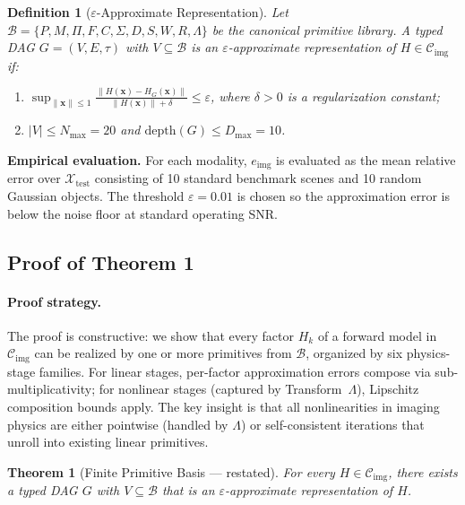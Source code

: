 \documentclass[11pt]{article}
\newtheorem{theorem}{Theorem}
\newtheorem{definition}{Definition}
\begin{document}
\begin{definition}[$\varepsilon$-Approximate Representation]
\label{def:eps_supp}
Let $\mathcal{B} = \{P, M, \Pi, F, C, \Sigma, D, S, W, R, \Lambda\}$ be the canonical primitive library. A typed DAG $G = (V, E, \tau)$ with $V \subseteq \mathcal{B}$ is an $\varepsilon$-approximate representation of $H \in \mathcal{C}_{\mathrm{img}}$ if:
\begin{enumerate}
  \item $\displaystyle \sup_{\|\mathbf{x}\| \leq 1} \frac{\|H(\mathbf{x}) - H_G(\mathbf{x})\|}{\|H(\mathbf{x})\| + \delta} \leq \varepsilon$, where $\delta > 0$ is a regularization constant;
  \item $|V| \leq N_{\max} = 20$ and $\mathrm{depth}(G) \leq D_{\max} = 10$.
\end{enumerate}
\end{definition}

\noindent\textbf{Empirical evaluation.} For each modality, $e_{\mathrm{img}}$ is evaluated as the mean relative error over $\mathcal{X}_{\mathrm{test}}$ consisting of 10 standard benchmark scenes and 10 random Gaussian objects. The threshold $\varepsilon = 0.01$ is chosen so the approximation error is below the noise floor at standard operating SNR.

\subsection{Proof of Theorem 1}

\paragraph{Proof strategy.}
The proof is constructive: we show that every factor $H_k$ of a forward model in $\mathcal{C}_{\mathrm{img}}$ can be realized by one or more primitives from $\mathcal{B}$, organized by six physics-stage families. For linear stages, per-factor approximation errors compose via sub-multiplicativity; for nonlinear stages (captured by Transform~$\Lambda$), Lipschitz composition bounds apply. The key insight is that all nonlinearities in imaging physics are either pointwise (handled by $\Lambda$) or self-consistent iterations that unroll into existing linear primitives.

\begin{theorem}[Finite Primitive Basis --- restated]
For every $H \in \mathcal{C}_{\mathrm{img}}$, there exists a typed DAG $G$ with $V \subseteq \mathcal{B}$ that is an $\varepsilon$-approximate representation of $H$.
\end{theorem}
\end{document}
